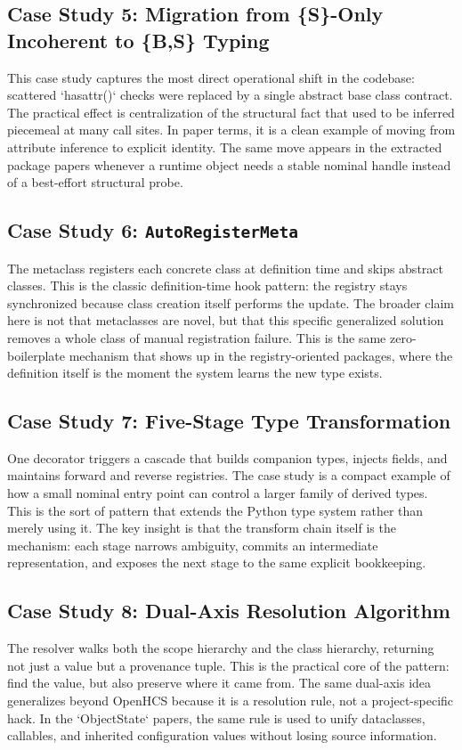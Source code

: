 \subsection{Case Study 5: Migration from \{S\}-Only Incoherent to \{B,S\} Typing}
This case study captures the most direct operational shift in the codebase: scattered `hasattr()` checks were replaced by a single abstract base class contract. The practical effect is centralization of the structural fact that used to be inferred piecemeal at many call sites. In paper terms, it is a clean example of moving from attribute inference to explicit identity. The same move appears in the extracted package papers whenever a runtime object needs a stable nominal handle instead of a best-effort structural probe.

\subsection{Case Study 6: \texttt{AutoRegisterMeta}}
The metaclass registers each concrete class at definition time and skips abstract classes. This is the classic definition-time hook pattern: the registry stays synchronized because class creation itself performs the update. The broader claim here is not that metaclasses are novel, but that this specific generalized solution removes a whole class of manual registration failure. This is the same zero-boilerplate mechanism that shows up in the registry-oriented packages, where the definition itself is the moment the system learns the new type exists.

\subsection{Case Study 7: Five-Stage Type Transformation}
One decorator triggers a cascade that builds companion types, injects fields, and maintains forward and reverse registries. The case study is a compact example of how a small nominal entry point can control a larger family of derived types. This is the sort of pattern that extends the Python type system rather than merely using it. The key insight is that the transform chain itself is the mechanism: each stage narrows ambiguity, commits an intermediate representation, and exposes the next stage to the same explicit bookkeeping.

\subsection{Case Study 8: Dual-Axis Resolution Algorithm}
The resolver walks both the scope hierarchy and the class hierarchy, returning not just a value but a provenance tuple. This is the practical core of the pattern: find the value, but also preserve where it came from. The same dual-axis idea generalizes beyond OpenHCS because it is a resolution rule, not a project-specific hack. In the `ObjectState` papers, the same rule is used to unify dataclasses, callables, and inherited configuration values without losing source information.

